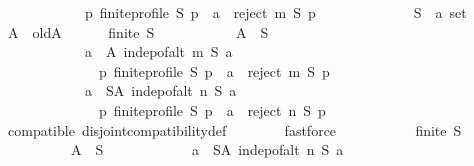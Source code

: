 \begin{isabellebody}
\ \ \ \ \ \ \ \ \ \ \ \ {\isacharparenleft}{\kern0pt}{\isasymforall}p{\isachardot}{\kern0pt}\ finite{\isacharunderscore}{\kern0pt}profile\ S\ p\ {\isasymlongrightarrow}\ a\ {\isasymin}\ reject\ m\ S\ p{\isacharparenright}{\kern0pt}{\isacharparenright}{\kern0pt}{\isacharparenright}{\kern0pt}{\isachardoublequoteclose}\isanewline
\ \ \isamarkupfalse%
\isanewline
\ \ \ \ \isamarkupfalse%
\isanewline
\ \ \ \ \ \ S\ {\isacharcolon}{\kern0pt}{\isacharcolon}{\kern0pt}\ {\isachardoublequoteopen}{\isacharprime}{\kern0pt}a\ set{\isachardoublequoteclose}\isanewline
\ \ \ \ \isamarkupfalse%
\ A\ \ old{\isacharunderscore}{\kern0pt}A{\isacharcolon}{\kern0pt}\isanewline
\ \ \ \ \ \ {\isachardoublequoteopen}finite\ S\ {\isasymlongrightarrow}\isanewline
\ \ \ \ \ \ \ \ \ \ {\isacharparenleft}{\kern0pt}A\ {\isasymsubseteq}\ S\ {\isasymand}\isanewline
\ \ \ \ \ \ \ \ \ \ \ \ {\isacharparenleft}{\kern0pt}{\isasymforall}a\ {\isasymin}\ A{\isachardot}{\kern0pt}\ indep{\isacharunderscore}{\kern0pt}of{\isacharunderscore}{\kern0pt}alt\ m\ S\ a\ {\isasymand}\isanewline
\ \ \ \ \ \ \ \ \ \ \ \ \ \ {\isacharparenleft}{\kern0pt}{\isasymforall}p{\isachardot}{\kern0pt}\ finite{\isacharunderscore}{\kern0pt}profile\ S\ p\ {\isasymlongrightarrow}\ a\ {\isasymin}\ reject\ m\ S\ p{\isacharparenright}{\kern0pt}{\isacharparenright}{\kern0pt}\ {\isasymand}\isanewline
\ \ \ \ \ \ \ \ \ \ \ \ {\isacharparenleft}{\kern0pt}{\isasymforall}a\ {\isasymin}\ S{\isacharminus}{\kern0pt}A{\isachardot}{\kern0pt}\ indep{\isacharunderscore}{\kern0pt}of{\isacharunderscore}{\kern0pt}alt\ n\ S\ a\ {\isasymand}\isanewline
\ \ \ \ \ \ \ \ \ \ \ \ \ \ {\isacharparenleft}{\kern0pt}{\isasymforall}p{\isachardot}{\kern0pt}\ finite{\isacharunderscore}{\kern0pt}profile\ S\ p\ {\isasymlongrightarrow}\ a\ {\isasymin}\ reject\ n\ S\ p{\isacharparenright}{\kern0pt}{\isacharparenright}{\kern0pt}{\isacharparenright}{\kern0pt}{\isachardoublequoteclose}\isanewline
\ \ \ \ \ \ \isamarkupfalse%
\ compatible\ disjoint{\isacharunderscore}{\kern0pt}compatibility{\isacharunderscore}{\kern0pt}def\isanewline
\ \ \ \ \ \ \isamarkupfalse%
\ fastforce\isanewline
\ \ \ \ \isamarkupfalse%
\isanewline
\ \ \ \ \ \ {\isachardoublequoteopen}finite\ S\ {\isasymlongrightarrow}\isanewline
\ \ \ \ \ \ \ \ \ \ {\isacharparenleft}{\kern0pt}{\isasymexists}A\ {\isasymsubseteq}\ S{\isachardot}{\kern0pt}\isanewline
\ \ \ \ \ \ \ \ \ \ \ \ {\isacharparenleft}{\kern0pt}{\isasymforall}a\ {\isasymin}\ S{\isacharminus}{\kern0pt}A{\isachardot}{\kern0pt}\ indep{\isacharunderscore}{\kern0pt}of{\isacharunderscore}{\kern0pt}alt\ n\ S\ a\ {\isasymand}\isanewline

\end{isabellebody}
